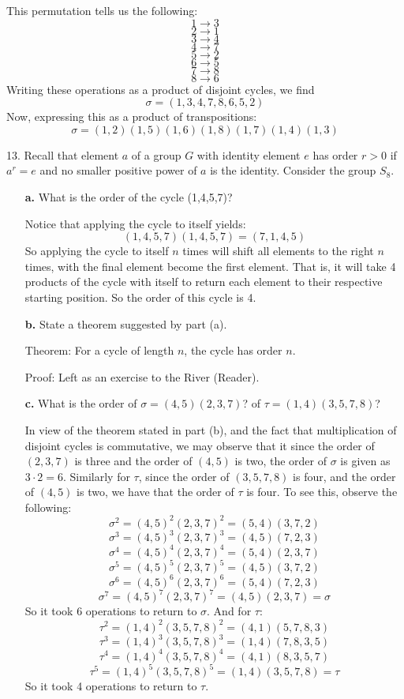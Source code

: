 \documentclass{article}
\begin{document}
This permutation tells us the following: 
\[1 \to 3\]
\[2 \to 1\]
\[3 \to 4\]
\[4 \to 7\]
\[5 \to 2\]
\[6 \to 5\]
\[7 \to 8\]
\[8 \to 6\]
Writing these operations as a product of disjoint cycles, we find
\[\sigma = (1, 3, 4, 7, 8, 6, 5, 2)\]
Now, expressing this as a product of transpositions:
\[\sigma = (1,2)(1,5)(1,6)(1,8)(1,7)(1,4)(1,3)\]

13. Recall that element $a$ of a group $G$ with identity element $e$ has order $r > 0$ if $a^r = e$ and no smaller positive power of $a$ is the identity. Consider the group $S_8$. 
\begin{enumerate}
    \item[\textbf{a.}] What is the order of the cycle (1,4,5,7)?
    
    Notice that applying the cycle to itself yields:
    \[(1,4,5,7)(1,4,5,7) = (7, 1, 4, 5)\]
    So applying the cycle to itself $n$ times will shift all elements to the right $n$ times, with the final element become the first element. That is, it will take 4 products of the cycle with itself to return each element to their respective starting position. So the order of this cycle is 4.
    
    \item[\textbf{b.}] State a theorem suggested by part (a).
    
    Theorem: For a cycle of length $n$, the cycle has order $n$. 
    
    Proof: Left as an exercise to the River (Reader).
    
    
    \item[\textbf{c.}] What is the order of $\sigma  = (4,5)(2,3,7)$? of $\tau = (1,4)(3,5,7,8)$?
    
    In view of the theorem stated in part (b), and the fact that multiplication of disjoint cycles is commutative, we may observe that it since the order of $(2,3,7)$ is three and the order of $(4,5)$ is two, the order of $\sigma$ is given as $3 \cdot 2 = 6$. Similarly for $\tau$, since the order of $(3,5,7,8)$ is four, and the order of $(4,5)$ is two, we have that the order of $\tau$ is four. To see this, observe the following:
    \[\sigma^2 = (4,5)^2(2,3,7)^2 = (5,4)(3,7,2)\]
    \[\sigma^3 = (4,5)^3(2,3,7)^3 = (4,5)(7,2,3)\]
    \[\sigma^4 = (4,5)^4(2,3,7)^4 = (5,4)(2,3,7)\]
    \[\sigma^5 = (4,5)^5(2,3,7)^5 = (4,5)(3,7,2)\]
    \[\sigma^6 = (4,5)^6(2,3,7)^6 = (5,4)(7,2,3)\]
    \[\sigma^7 = (4,5)^7(2,3,7)^7 = (4,5)(2,3,7) = \sigma\]
    So it took 6 operations to return to $\sigma$. And for $\tau$:
    \[\tau^2 = (1,4)^2(3,5,7,8)^2 = (4,1)(5,7,8,3)\]
    \[\tau^3 = (1,4)^3(3,5,7,8)^3 = (1,4)(7,8,3,5)\]
    \[\tau^4 = (1,4)^4(3,5,7,8)^4 = (4,1)(8,3,5,7)\]
    \[\tau^5 = (1,4)^5(3,5,7,8)^5 = (1,4)(3,5,7,8) = \tau\]
    So it took 4 operations to return to $\tau$.
    

\end{enumerate}
\end{document}
